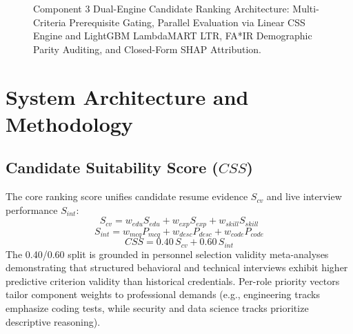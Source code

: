 \documentclass[conference]{IEEEtran}
\begin{document}
\begin{figure}[t]
\caption{Component 3 Dual-Engine Candidate Ranking Architecture: Multi-Criteria Prerequisite Gating, Parallel Evaluation via Linear CSS Engine and LightGBM LambdaMART LTR, FA*IR Demographic Parity Auditing, and Closed-Form SHAP Attribution.}
\label{fig:c3_pipeline}
\end{figure}

\section{System Architecture and Methodology}

\subsection{Candidate Suitability Score ($CSS$)}
The core ranking score unifies candidate resume evidence $S_{cv}$ and live interview performance $S_{int}$:
\begin{equation}
S_{cv} = w_{edu} S_{edu} + w_{exp} S_{exp} + w_{skill} S_{skill}
\end{equation}
\begin{equation}
S_{int} = w_{mcq} P_{mcq} + w_{desc} P_{desc} + w_{code} P_{code}
\end{equation}
\begin{equation}
CSS = 0.40\,S_{cv} + 0.60\,S_{int}
\end{equation}
The 0.40/0.60 split is grounded in personnel selection validity meta-analyses demonstrating that structured behavioral and technical interviews exhibit higher predictive criterion validity than historical credentials. Per-role priority vectors tailor component weights to professional demands (e.g., engineering tracks emphasize coding tests, while security and data science tracks prioritize descriptive reasoning).
\end{document}
